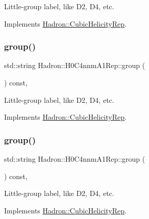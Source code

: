 Little-\/group label, like D2, D4, etc. 

Implements \mbox{\hyperlink{structHadron_1_1CubicHelicityRep_a101a7d76cd8ccdad0f272db44b766113}{Hadron\+::\+Cubic\+Helicity\+Rep}}.

\mbox{\label{structHadron_1_1H0C4nnmA1Rep_a285f5eda1399e94ac66264af1a41c08a}} 
\subsubsection{\texorpdfstring{group()}{group()}\hspace{0.1cm}{\footnotesize\ttfamily [2/3]}}
{\footnotesize\ttfamily std\+::string Hadron\+::\+H0\+C4nnm\+A1\+Rep\+::group (\begin{DoxyParamCaption}{ }\end{DoxyParamCaption}) const\hspace{0.3cm}{\ttfamily [inline]}, {\ttfamily [virtual]}}

Little-\/group label, like D2, D4, etc. 

Implements \mbox{\hyperlink{structHadron_1_1CubicHelicityRep_a101a7d76cd8ccdad0f272db44b766113}{Hadron\+::\+Cubic\+Helicity\+Rep}}.

\mbox{\label{structHadron_1_1H0C4nnmA1Rep_a285f5eda1399e94ac66264af1a41c08a}} 
\subsubsection{\texorpdfstring{group()}{group()}\hspace{0.1cm}{\footnotesize\ttfamily [3/3]}}
{\footnotesize\ttfamily std\+::string Hadron\+::\+H0\+C4nnm\+A1\+Rep\+::group (\begin{DoxyParamCaption}{ }\end{DoxyParamCaption}) const\hspace{0.3cm}{\ttfamily [inline]}, {\ttfamily [virtual]}}

Little-\/group label, like D2, D4, etc. 

Implements \mbox{\hyperlink{structHadron_1_1CubicHelicityRep_a101a7d76cd8ccdad0f272db44b766113}{Hadron\+::\+Cubic\+Helicity\+Rep}}.

